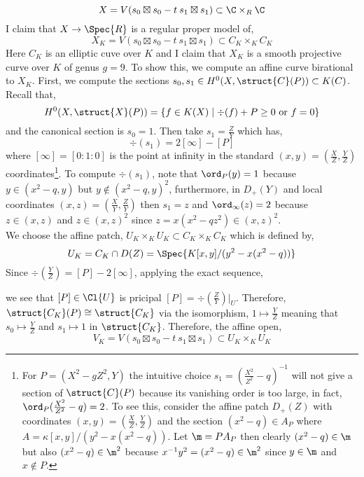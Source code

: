 \[ X = V(s_0 \boxtimes s_0 - t \: s_1 \boxtimes s_1) \subset \C \times_R \C \]
I claim that $X \to \Spec{R}$ is a regular proper model of,
\[ X_K = V(s_0 \boxtimes s_0 - t \: s_1 \boxtimes s_1) \subset C_K \times_K C_K \]
Here $C_K$ is an elliptic cuve over $K$ and I claim that $X_K$ is a smooth projective curve over $K$ of genus $g = 9$. To show this, we compute an affine curve birational to $X_K$. First, we compute the sections $s_0, s_1 \in H^0(X, \struct{C}(P)) \subset K(C)$. Recall that,
\[ H^0(X, \struct{X}(P)) = \{ f \in K(X) \mid \div{(f)} + P \ge 0 \text{ or } f = 0 \} \]
and the canonical section is $s_0 = 1$. Then take $s_1 = \frac{Z}{Y}$ which has, 
\[ \div{(s_1)} = 2 [\infty] - [P] \]
where $[\infty] = [0 : 1 : 0]$ is the point at infinity in the standard $(x, y) = (\frac{X}{Z}, \frac{Y}{Z})$ coordinates\footnote{For $P = (X^2 - g Z^2, Y)$ the intuitive choice $s_1 = (\frac{X^2}{Z^2} - q)^{-1}$ will not give a section of $\struct{C}(P)$ because its vanishing order is too large, in fact, $\ord_{P}{(\frac{X^2}{Z^2} - q)} = 2$. To see this, consider the affine patch $D_{+}(Z)$ with coordinates $(x, y) = (\frac{X}{Z}, \frac{Y}{Z})$ and the section $(x^2 - q) \in A_{P}$ where $A = \kappa[x, y]/(y^2 - x(x^2 - q))$. Let $\m = P A_P$ then clearly $(x^2 - q) \in \m$ but also $(x^2 - q) \in \m^2$ because $x^{-1} y^2 = (x^2 - q) \in \m^2$ since $y \in \m$ and $x \notin P$.}. To compute $\div{(s_1)}$, note that $\ord_{P}(y) = 1$ because $y \in (x^2 - q, y)$ but $y \notin (x^2 - q, y)^2$, furthermore, in $D_+(Y)$ and local coordinates $(x,z) = (\frac{X}{Y}, \frac{Z}{Y})$ then $s_1 = z$ and $\ord_{\infty}(z) = 2$ because $z \in (x, z)$ and $z \in (x, z)^2$ since $z = x(x^2 - q z^2) \in (x, z)^2$. 
\bigskip\\
We choose the affine patch, $U_K \times_K U_K \subset C_K \times_K C_K$ which is defined by,
\[ U_K = C_K \cap D(Z) = \Spec{K[x,y]/(y^2 - x(x^2 - q))} \]
Since $\div{(\frac{Y}{Z})} = [P] - 2 [\infty]$, applying the exact sequence,
\begin{center}
\end{center}
we see that $[P] \in \Cl{U}$ is pricipal $[P] = \div{(\frac{Z}{Y})}|_U$. Therefore, $\struct{C_K}(P) \cong \struct{C_K}$ via the isomorphism, $1 \mapsto \frac{Y}{Z}$ meaning that $s_0 \mapsto \frac{Y}{Z}$ and $s_1 \mapsto 1$ in $\struct{C_K}$. Therefore, the affine open,
\[ V_K = V(s_0 \boxtimes s_0 - t \: s_1 \boxtimes s_1) \subset U_K \times_K U_K \]
